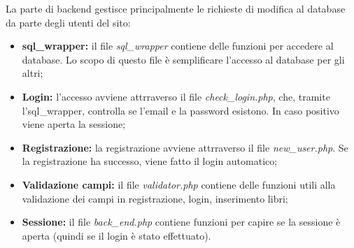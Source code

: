 La parte di backend gestisce principalmente le richieste di modifica al database da parte degli utenti del sito:
\begin{itemize}
    \item \textbf{sql\_wrapper:} il file \textit{sql\_wrapper} contiene delle funzioni per accedere al database. Lo scopo di questo file è semplificare l'accesso al database per gli altri;  
    \item \textbf{Login:} l'accesso avviene attrraverso il file \textit{check\_login.php}, che, tramite l'sql\_wrapper, controlla se l'email e la password esistono. In caso positivo viene aperta la sessione;
    \item \textbf{Registrazione:} la registrazione avviene attrraverso il file \textit{new\_user.php}. Se la registrazione ha successo, viene fatto il login automatico;
    \item \textbf{Validazione campi:} il file \textit{validator.php} contiene delle funzioni utili alla validazione dei campi in registrazione, login, inserimento libri;
    \item \textbf{Sessione:} il file \textit{back\_end.php} contiene funzioni per capire se la sessione è aperta (quindi se il login è stato effettuato).
\end{itemize}